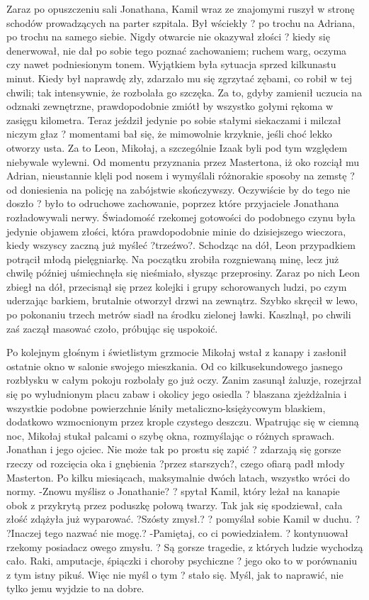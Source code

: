\documentclass[../MAIN.tex]{subfiles}
\begin{document}
Zaraz po opuszczeniu sali Jonathana, Kamil wraz ze znajomymi ruszył w stronę schodów prowadzących na parter szpitala. Był wściekły ? po trochu na Adriana, po trochu na samego siebie.
Nigdy otwarcie nie okazywał złości ? kiedy się denerwował, nie dał po sobie tego poznać zachowaniem; ruchem warg, oczyma czy nawet podniesionym tonem. Wyjątkiem była sytuacja sprzed kilkunastu minut. Kiedy był naprawdę zły, zdarzało mu się zgrzytać zębami, co robił w tej chwili; tak intensywnie, że rozbolała go szczęka.
Za to, gdyby zamienił uczucia na odznaki zewnętrzne, prawdopodobnie zmiótł by wszystko gołymi rękoma w zasięgu kilometra. Teraz jeździł jedynie po sobie stałymi siekaczami i milczał niczym głaz ? momentami bał się, że mimowolnie krzyknie, jeśli choć lekko otworzy usta.
Za to Leon, Mikołaj, a szczególnie Izaak byli pod tym względem niebywale wylewni. Od momentu przyznania przez Mastertona, iż oko rozciął mu Adrian, nieustannie klęli pod nosem i wymyślali różnorakie sposoby na zemstę ? od doniesienia na policję na zabójstwie skończywszy. Oczywiście by do tego nie doszło ? było to odruchowe zachowanie, poprzez które przyjaciele Jonathana rozładowywali nerwy. Świadomość rzekomej gotowości do podobnego czynu była jedynie objawem złości, która prawdopodobnie minie do dzisiejszego wieczora, kiedy wszyscy zaczną już myśleć ?trzeźwo?.
Schodząc na dół, Leon przypadkiem potrącił młodą pielęgniarkę. Na początku zrobiła rozgniewaną minę, lecz już chwilę później uśmiechnęła się nieśmiało, słysząc przeprosiny. Zaraz po nich Leon zbiegł na dół, przecisnął się przez kolejki i grupy schorowanych ludzi, po czym uderzając barkiem, brutalnie otworzył drzwi na zewnątrz. Szybko skręcił w lewo, po pokonaniu trzech metrów siadł na środku zielonej ławki.
Kaszlnął, po chwili zaś zaczął masować czoło, próbując się uspokoić.


Po kolejnym głośnym i świetlistym grzmocie Mikołaj wstał z kanapy i zasłonił ostatnie okno w salonie swojego mieszkania. Od co kilkusekundowego jasnego rozbłysku w całym pokoju rozbolały go już oczy.
Zanim zasunął żaluzje, rozejrzał się po wyludnionym placu zabaw i okolicy jego osiedla ? blaszana zjeżdżalnia i wszystkie podobne powierzchnie lśniły metaliczno-księżycowym blaskiem, dodatkowo wzmocnionym przez krople czystego deszczu. Wpatrując się w ciemną noc, Mikołaj stukał palcami o szybę okna, rozmyślając o różnych sprawach.
Jonathan i jego ojciec. Nie może tak po prostu się zapić ? zdarzają się gorsze rzeczy od rozcięcia oka i gnębienia ?przez starszych?, czego ofiarą padł młody Masterton. Po kilku miesiącach, maksymalnie dwóch latach, wszystko wróci do normy.
-Znowu myślisz o Jonathanie? ? spytał Kamil, który leżał na kanapie obok z przykrytą przez poduszkę połową twarzy. Tak jak się spodziewał, cała złość zdążyła już wyparować.
?Szósty zmysł.? ? pomyślał sobie Kamil w duchu. ? ?Inaczej tego nazwać nie mogę.?
-Pamiętaj, co ci powiedziałem. ? kontynuował rzekomy posiadacz owego zmysłu. ? Są gorsze tragedie, z których ludzie wychodzą cało. Raki, amputacje, śpiączki i choroby psychiczne ? jego oko to w porównaniu z tym istny pikuś. Więc nie myśl o tym ? stało się. Myśl, jak to naprawić, nie tylko jemu wyjdzie to na dobre.
\end{document}
